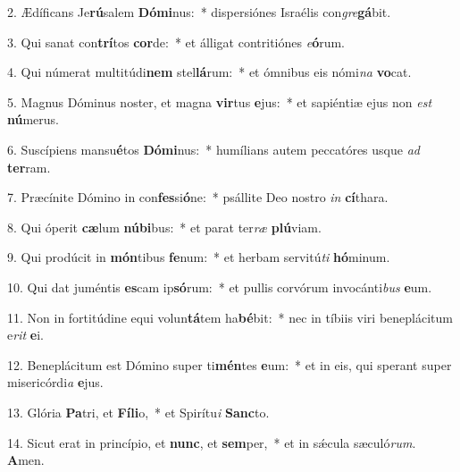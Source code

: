 2. Ædíficans Je\textbf{rú}salem \textbf{Dó}\textbf{mi}nus:~*  dispersiónes Israélis con\textit{gre}\textbf{gá}bit.\

3. Qui sanat con\textbf{trí}tos \textbf{cor}de:~*  et álligat contritiónes \textit{e}\textbf{ó}rum.\

4. Qui númerat multitúdi\textbf{nem} stel\textbf{lá}rum:~*  et ómnibus eis nómi\textit{na} \textbf{vo}cat.\

5. Magnus Dóminus noster, et magna \textbf{vir}tus \textbf{e}jus:~*  et sapiéntiæ ejus non \textit{est} \textbf{nú}merus.\

6. Suscípiens mansu\textbf{é}tos \textbf{Dó}\textbf{mi}nus:~*  humílians autem peccatóres usque \textit{ad} \textbf{ter}ram.\

7. Præcínite Dómino in con\textbf{fes}si\textbf{ó}ne:~*  psállite Deo nostro \textit{in} \textbf{cí}thara.\

8. Qui óperit \textbf{cæ}lum \textbf{nú}\textbf{bi}bus:~*  et parat ter\textit{ræ} \textbf{plú}viam.\

9. Qui prodúcit in \textbf{món}tibus \textbf{fe}num:~*  et herbam servitú\textit{ti} \textbf{hó}minum.\

10. Qui dat juméntis \textbf{es}cam ip\textbf{só}rum:~*  et pullis corvórum invocánti\textit{bus} \textbf{e}um.\

11. Non in fortitúdine equi volun\textbf{tá}tem ha\textbf{bé}bit:~*  nec in tíbiis viri beneplácitum e\textit{rit} \textbf{e}i.\

12. Beneplácitum est Dómino super ti\textbf{mén}tes \textbf{e}um:~*  et in eis, qui sperant super misericórdi\textit{a} \textbf{e}jus.\

13. Glória \textbf{Pa}tri, et \textbf{Fí}\textbf{li}o,~*  et Spirítu\textit{i} \textbf{Sanc}to.\

14. Sicut erat in princípio, et \textbf{nunc}, et \textbf{sem}per,~*  et in sǽcula sæculó\textit{rum}. \textbf{A}men.\

